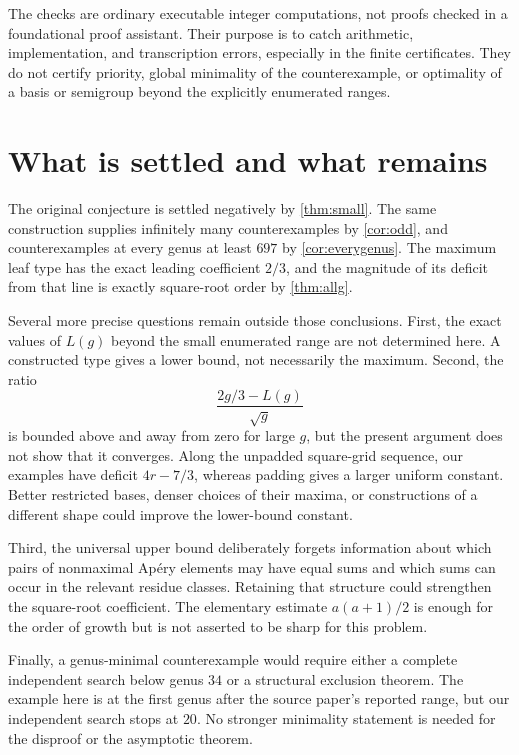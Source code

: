 \documentclass[11pt,letterpaper]{article}
\numberwithin{equation}{section}
\theoremstyle{definition}
\theoremstyle{remark}
\begin{document}
The checks are ordinary executable integer computations, not proofs checked
in a foundational proof assistant. Their purpose is to catch arithmetic,
implementation, and transcription errors, especially in the finite
certificates. They do not certify priority, global minimality of the
counterexample, or optimality of a basis or semigroup beyond the explicitly
enumerated ranges.

\section{What is settled and what remains}\label{sec:remaining}

The original conjecture is settled negatively by \cref{thm:small}. The
same construction supplies infinitely many counterexamples by
\cref{cor:odd}, and counterexamples at every genus at least $697$ by
\cref{cor:everygenus}. The maximum leaf type has the exact leading
coefficient $2/3$, and the magnitude of its deficit from that line is
exactly square-root order by \cref{thm:allg}.

Several more precise questions remain outside those conclusions. First,
the exact values of $L(g)$ beyond the small enumerated range are not
determined here. A constructed type gives a lower bound, not necessarily
the maximum. Second, the ratio
\[
 \frac{2g/3-L(g)}{\sqrt g}
\]
is bounded above and away from zero for large $g$, but the present argument
does not show that it converges. Along the unpadded square-grid sequence,
our examples have deficit $4r-7/3$, whereas padding gives a larger uniform
constant. Better restricted bases, denser choices of their maxima, or
constructions of a different shape could improve the lower-bound constant.

Third, the universal upper bound deliberately forgets information about
which pairs of nonmaximal Ap\'ery elements may have equal sums and which
sums can occur in the relevant residue classes. Retaining that structure
could strengthen the square-root coefficient. The elementary estimate
$a(a+1)/2$ is enough for the order of growth but is not asserted to be
sharp for this problem.

Finally, a genus-minimal counterexample would require either a complete
independent search below genus $34$ or a structural exclusion theorem. The
example here is at the first genus after the source paper's reported range,
but our independent search stops at $20$. No stronger minimality statement
is needed for the disproof or the asymptotic theorem.
\end{document}
